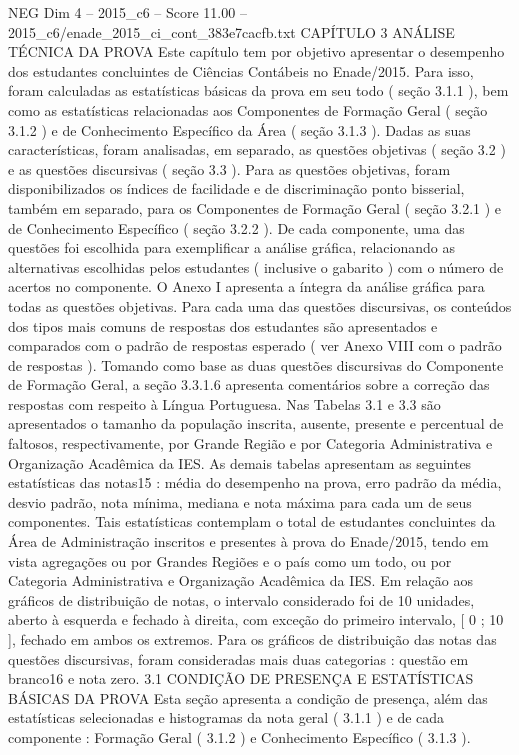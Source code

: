 \begin{textsample}{NEG Dim 4 – 2015\_c6 – Score 11.00 – 2015\_c6/enade\_2015\_ci\_cont\_383e7cacfb.txt}  \label{ex:f4_neg_332}
CAPÍTULO 3 ANÁLISE TÉCNICA DA PROVA Este capítulo tem por objetivo apresentar o desempenho dos estudantes concluintes de Ciências Contábeis no Enade/2015.
Para isso, foram calculadas as estatísticas básicas da prova em seu todo ( seção 3.1.1 ), bem como as estatísticas relacionadas aos Componentes de Formação Geral ( seção 3.1.2 ) e de Conhecimento Específico da Área ( seção 3.1.3 ).
Dadas as suas características, foram analisadas, em separado, as questões objetivas ( seção 3.2 ) e as questões discursivas ( seção 3.3 ).
Para as questões objetivas, foram disponibilizados os índices de facilidade e de discriminação ponto bisserial, também em separado, para os Componentes de Formação Geral ( seção 3.2.1 ) e de Conhecimento Específico ( seção 3.2.2 ).
De cada componente, uma das questões foi escolhida para exemplificar a análise gráfica, relacionando as alternativas escolhidas pelos estudantes ( inclusive o gabarito ) com o número de acertos no componente.
O Anexo I apresenta a íntegra da análise gráfica para todas as questões objetivas.
Para cada uma das questões discursivas, os conteúdos dos tipos mais comuns de respostas dos estudantes são apresentados e comparados com o padrão de respostas esperado ( ver Anexo VIII com o padrão de respostas ).
Tomando como base as duas questões discursivas do Componente de Formação Geral, a seção 3.3.1.6 apresenta comentários sobre a correção das respostas com respeito à Língua Portuguesa.
Nas Tabelas 3.1 e 3.3 são apresentados o tamanho da população inscrita, ausente, presente e percentual de faltosos, respectivamente, por Grande Região e por Categoria Administrativa e Organização Acadêmica da IES.
As demais tabelas apresentam as seguintes estatísticas das notas15 : média do desempenho na prova, erro padrão da média, desvio padrão, nota mínima, mediana e nota máxima para cada um de seus componentes.
Tais estatísticas contemplam o total de estudantes concluintes da Área de Administração inscritos e presentes à prova do Enade/2015, tendo em vista agregações ou por Grandes Regiões e o país como um todo, ou por Categoria Administrativa e Organização Acadêmica da IES.
Em relação aos gráficos de distribuição de notas, o intervalo considerado foi de 10 unidades, aberto à esquerda e fechado à direita, com exceção do primeiro intervalo, [ 0 ; 10 ], fechado em ambos os extremos.
Para os gráficos de distribuição das notas das questões discursivas, foram consideradas mais duas categorias : questão em branco16 e nota zero. 3.1 CONDIÇÃO DE PRESENÇA E ESTATÍSTICAS BÁSICAS DA PROVA Esta seção apresenta a condição de presença, além das estatísticas selecionadas e histogramas da nota geral ( 3.1.1 ) e de cada componente : Formação Geral ( 3.1.2 ) e Conhecimento Específico ( 3.1.3 ).

\end{textsample}
